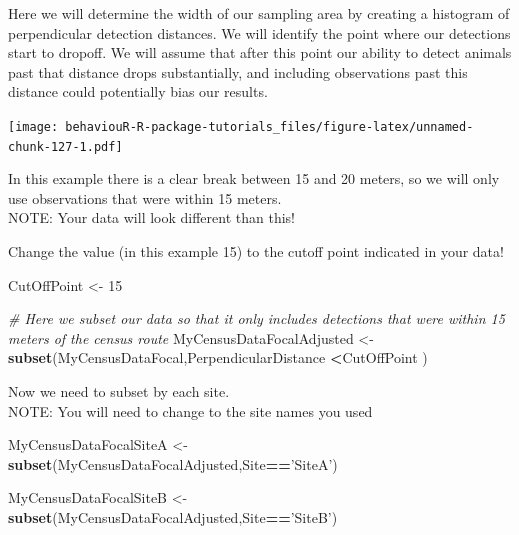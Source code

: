 \documentclass[]{book}
\newenvironment{Shaded}{\begin{snugshade}}{\end{snugshade}}
\newcommand{\CommentTok}[1]{\textcolor[rgb]{0.56,0.35,0.01}{\textit{#1}}}
\newcommand{\DataTypeTok}[1]{\textcolor[rgb]{0.13,0.29,0.53}{#1}}
\newcommand{\DecValTok}[1]{\textcolor[rgb]{0.00,0.00,0.81}{#1}}
\newcommand{\KeywordTok}[1]{\textcolor[rgb]{0.13,0.29,0.53}{\textbf{#1}}}
\newcommand{\NormalTok}[1]{#1}
\newcommand{\OperatorTok}[1]{\textcolor[rgb]{0.81,0.36,0.00}{\textbf{#1}}}
\newcommand{\StringTok}[1]{\textcolor[rgb]{0.31,0.60,0.02}{#1}}
\begin{document}
Here we will determine the width of our sampling area by creating a histogram of perpendicular detection distances. We will identify the point where our detections start to dropoff. We will assume that after this point our ability to detect animals past that distance drops substantially, and including observations past this distance could potentially bias our results.

\begin{Shaded}
\end{Shaded}

\texttt{[image: behaviouR-R-package-tutorials\_files/figure-latex/unnamed-chunk-127-1.pdf]}

In this example there is a clear break between 15 and 20 meters, so we will only use observations that were within 15 meters.\\
NOTE: Your data will look different than this!

Change the value (in this example 15) to the cutoff point indicated in your data!

\begin{Shaded}
\begin{Highlighting}[]
\NormalTok{CutOffPoint <-}\StringTok{ }\DecValTok{15}
\end{Highlighting}
\end{Shaded}

\begin{Shaded}
\begin{Highlighting}[]
\CommentTok{# Here we subset our data so that it only includes detections that were within 15 meters of the census route}
\NormalTok{MyCensusDataFocalAdjusted <-}\StringTok{ }\KeywordTok{subset}\NormalTok{(MyCensusDataFocal,PerpendicularDistance }\OperatorTok{<}\NormalTok{CutOffPoint )}
\end{Highlighting}
\end{Shaded}

Now we need to subset by each site.\\
NOTE: You will need to change to the site names you used

\begin{Shaded}
\begin{Highlighting}[]
\NormalTok{MyCensusDataFocalSiteA <-}\StringTok{ }\KeywordTok{subset}\NormalTok{(MyCensusDataFocalAdjusted,Site}\OperatorTok{==}\StringTok{'SiteA'}\NormalTok{)}

\NormalTok{MyCensusDataFocalSiteB <-}\StringTok{ }\KeywordTok{subset}\NormalTok{(MyCensusDataFocalAdjusted,Site}\OperatorTok{==}\StringTok{'SiteB'}\NormalTok{)}
\end{Highlighting}
\end{Shaded}
\end{document}
